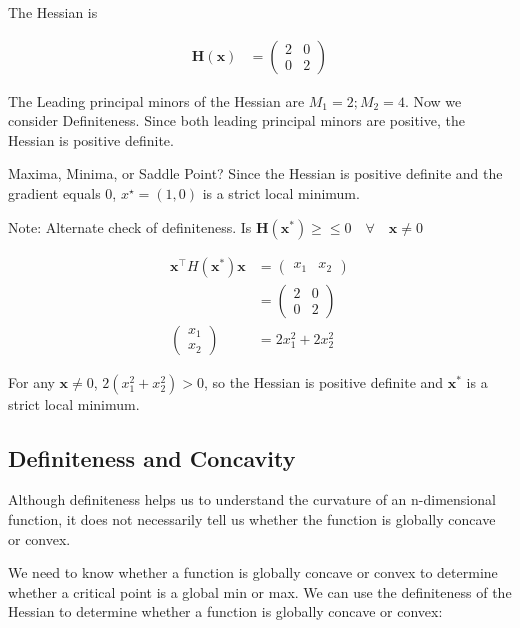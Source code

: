 \documentclass[]{book}
\theoremstyle{definition}
\theoremstyle{definition}
\theoremstyle{definition}
\theoremstyle{remark}
\let\BeginKnitrBlock\begin \let\EndKnitrBlock\end
\begin{document}
\BeginKnitrBlock{solution}
{} The Hessian is

\begin{align*}
\mathbf{H(x)} &= \begin{pmatrix} 2&0\\0&2 \end{pmatrix}
\end{align*}

The Leading principal minors of the Hessian are \(M_1=2; M_2=4\). Now we
consider Definiteness. Since both leading principal minors are positive,
the Hessian is positive definite.

Maxima, Minima, or Saddle Point? Since the Hessian is positive definite
and the gradient equals 0, \(x^\star = (1,0)\) is a strict local
minimum.

Note: Alternate check of definiteness. Is
\(\mathbf{H(x^*)} \geq \leq 0 \quad \forall \quad \mathbf{x}\ne 0\)

\begin{align*}
\mathbf{x}^\top H(\mathbf{x}^*) \mathbf{x} &= \begin{pmatrix} x_1 & x_2 \end{pmatrix}\\
&= \begin{pmatrix} 2&0\\0&2 \end{pmatrix}\\
\begin{pmatrix} x_1\\x_2\end{pmatrix} &= 2x_1^2+2x_2^2
\end{align*}

For any \(\mathbf{x}\ne 0\), \(2(x_1^2+x_2^2)>0\), so the Hessian is
positive definite and \(\mathbf{x}^*\) is a strict local minimum.
\EndKnitrBlock{solution}

\subsection*{Definiteness and
Concavity}\label{definiteness-and-concavity}

Although definiteness helps us to understand the curvature of an
n-dimensional function, it does not necessarily tell us whether the
function is globally concave or convex.

We need to know whether a function is globally concave or convex to
determine whether a critical point is a global min or max. We can use
the definiteness of the Hessian to determine whether a function is
globally concave or convex:
\end{document}
